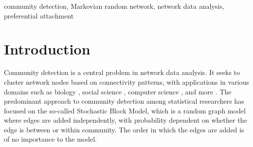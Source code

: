 \documentclass[twoside,11pt]{article}
\theoremstyle{remark}
\begin{document}
\begin{keywords}
community detection, Markovian random network, network data analysis, preferential attachment
\end{keywords}




\section{Introduction}

Community detection is a central problem in network data analysis. It seeks to cluster network nodes based on connectivity patterns, with applications in various domains such as biology \citep{krzakala2013spectral,traag2019louvain,yu2007graph}, social science \citep{ji2022co,akbaritabar2020italian}, computer science \citep{velickovic2018deep,wang2016botnet}, and more \citep{de2020unveiling}. The predominant approach to community detection among statistical researchers has focused on the so-called Stochastic Block Model, which is a random graph model where edges are added independently, with probability dependent on whether the edge is between or within community. The order in which the edges are added is of no importance to the model. 
\end{document}
